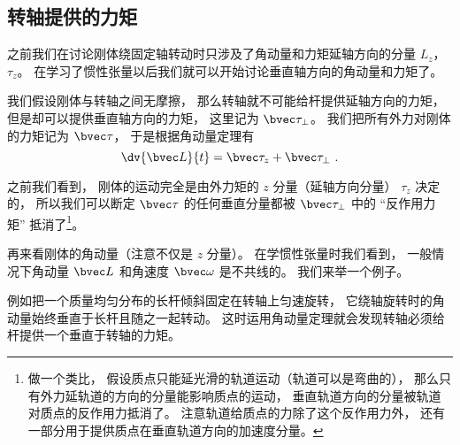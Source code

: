 
\begin{issues}
\issueDraft
\end{issues}


\subsection{转轴提供的力矩}
之前我们在讨论刚体绕固定轴转动时只涉及了角动量和力矩延轴方向的分量 $L_z$， $\tau_z$。 在学习了惯性张量以后我们就可以开始讨论垂直轴方向的角动量和力矩了。


我们假设刚体与转轴之间无摩擦， 那么转轴就不可能给杆提供延轴方向的力矩， 但是却可以提供垂直轴方向的力矩， 这里记为 $\bvec\tau_\bot$。 我们把所有外力对刚体的力矩记为 $\bvec\tau$， 于是根据角动量定理有
\begin{equation}
\dv{\bvec L}{t} = \bvec\tau_z + \bvec\tau_\bot~.
\end{equation}

之前我们看到， 刚体的运动完全是由外力矩的 $z$ 分量（延轴方向分量） $\tau_z$ 决定的， 所以我们可以断定 $\bvec\tau$ 的任何垂直分量都被 $\bvec\tau_\bot$ 中的 “反作用力矩” 抵消了\footnote{做一个类比， 假设质点只能延光滑的轨道运动（轨道可以是弯曲的）， 那么只有外力延轨道的方向的分量能影响质点的运动， 垂直轨道方向的分量被轨道对质点的反作用力抵消了。 注意轨道给质点的力除了这个反作用力外， 还有一部分用于提供质点在垂直轨道方向的加速度分量。}。

再来看刚体的角动量（注意不仅是 $z$ 分量）。 在学惯性张量时我们看到， 一般情况下角动量 $\bvec L$ 和角速度 $\bvec \omega$ 是不共线的。 我们来举一个例子。


\begin{example}{}\label{ex_RBrot2_1}
例如把一个质量均匀分布的长杆倾斜固定在转轴上匀速旋转，%
它绕轴旋转时的角动量始终垂直于长杆且随之一起转动。 这时运用角动量定理就会发现转轴必须给杆提供一个垂直于转轴的力矩。
\end{example}
